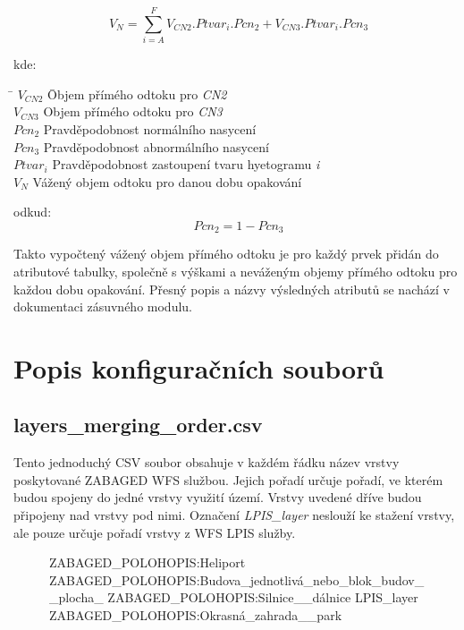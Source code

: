 \documentclass[a4paper,oneside,12pt]{book}
\begin{document}
\begin{equation}
V_{N} = \sum_{i = A}^{F} \mathit{V}_{CN2} . Ptvar_{i} . Pcn_{2} + \mathit{V}_{CN3} . Ptvar_{i} . Pcn_{3}
\end{equation}

kde:
\begin{tabbing}
    \hspace{10mm} \= $\mathit{V}_{CN2}$ \hspace{5mm} \= Objem přímého odtoku pro \textit{CN2} \\
    \> $\mathit{V}_{CN3}$ \> Objem přímého odtoku pro \textit{CN3} \\ 
    \> $Pcn_{2}$  \> Pravděpodobnost normálního nasycení \\
    \> $Pcn_{3}$ \> Pravděpodobnost abnormálního nasycení \\
    \> $Ptvar_{i}$ \> Pravděpodobnost zastoupení tvaru hyetogramu \textit{i} \\
    \> $V_{N}$ \> Vážený objem odtoku pro danou dobu opakování 
\end{tabbing}
odkud: 
\begin{equation}
Pcn_{2} = 1 -  Pcn_{3}
\end{equation}

\hspace{10mm} Takto vypočtený vážený objem přímého odtoku je pro každý prvek přidán do atributové tabulky, společně s výškami a neváženým objemy přímého odtoku  pro každou dobu opakování. Přesný popis a názvy výsledných atributů se nachází v dokumentaci zásuvného modulu. %

\section{Popis konfiguračních souborů} \label{config}
\subsection*{layers\_merging\_order.csv} \label{layers_merging_order.csv}
\hspace{10mm}Tento jednoduchý CSV soubor obsahuje v každém řádku název vrstvy poskytované ZABAGED WFS službou. Jejich pořadí určuje pořadí, ve kterém budou spojeny do jedné vrstvy využití území. Vrstvy uvedené dříve budou připojeny nad vrstvy pod nimi. Označení \textit{LPIS\_layer} neslouží ke stažení vrstvy, ale pouze určuje pořadí vrstvy z WFS LPIS služby.

\begin{figure}[H]
\begin{pythoncode}[style=mypython, caption={Ukázka layers\_merging\_order.csv},label={kod:layers_merging_order.csv}]
ZABAGED_POLOHOPIS:Heliport
ZABAGED_POLOHOPIS:Budova_jednotlivá_nebo_blok_budov__plocha_
ZABAGED_POLOHOPIS:Silnice__dálnice
LPIS_layer
ZABAGED_POLOHOPIS:Okrasná_zahrada__park
\end{pythoncode}
\end{figure}
\end{document}
